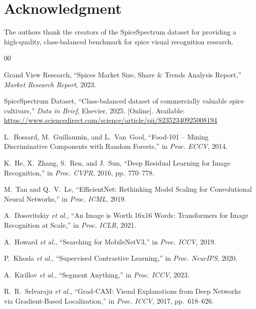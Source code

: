 \documentclass[conference]{IEEEtran}
\begin{document}
\section*{Acknowledgment}
The authors thank the creators of the SpiceSpectrum dataset for providing a
high-quality, class-balanced benchmark for spice visual recognition research.


\begin{thebibliography}{00}

Grand View Research, ``Spices Market Size, Share \& Trends Analysis Report,''
\textit{Market Research Report}, 2023.

SpiceSpectrum Dataset, ``Class-balanced dataset of commercially valuable spice
cultivars,'' \textit{Data in Brief}, Elsevier, 2025.
[Online]. Available: \url{https://www.sciencedirect.com/science/article/pii/S2352340925008194}

L.~Bossard, M.~Guillaumin, and L.~Van~Gool,
``Food-101 -- Mining Discriminative Components with Random Forests,''
in \textit{Proc. ECCV}, 2014.

K.~He, X.~Zhang, S.~Ren, and J.~Sun,
``Deep Residual Learning for Image Recognition,''
in \textit{Proc. CVPR}, 2016, pp.~770--778.

M.~Tan and Q.~V.~Le,
``EfficientNet: Rethinking Model Scaling for Convolutional Neural Networks,''
in \textit{Proc. ICML}, 2019.

A.~Dosovitskiy \textit{et al.},
``An Image is Worth 16x16 Words: Transformers for Image Recognition at Scale,''
in \textit{Proc. ICLR}, 2021.

A.~Howard \textit{et al.},
``Searching for MobileNetV3,''
in \textit{Proc. ICCV}, 2019.

P.~Khosla \textit{et al.},
``Supervised Contrastive Learning,''
in \textit{Proc. NeurIPS}, 2020.

A.~Kirillov \textit{et al.},
``Segment Anything,''
in \textit{Proc. ICCV}, 2023.

R.~R.~Selvaraju \textit{et al.},
``Grad-CAM: Visual Explanations from Deep Networks via Gradient-Based Localization,''
in \textit{Proc. ICCV}, 2017, pp.~618--626.


\end{thebibliography}
\end{document}
